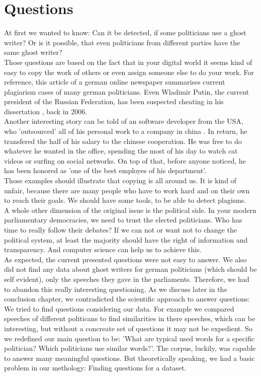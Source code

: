 \documentclass[12pt,paper=a4,nenglish]{scrreprt}
\begin{document}
\section{Questions}
At first we wanted to know: Can it be detected, if some politicians
use a ghost writer? Or is it possible, that even politicians from different
parties have the same ghost writer? \\ 
Those questions are based on the fact that in your digital world it
seems kind of easy to copy the work of others or even assign someone else to do
your work. For reference, this article \cite{plagiat_1} of a german online newspaper 
summarises current plagiarism cases of many german politicians. 
Even Wladimir Putin, the current president of the Russian Federation, has been
suspected cheating in his dissertation \cite{plagiat_2}, back in
2006. \\
Another interesting story can be told of an software developer from the USA,
who 'outsourced' all of his personal work to a company in china
\cite{plagiat_3}. In return, he transfered the half of his salary to the chinese
cooperation. He was free to do whatever he wanted in the office, spending the
most of his day to watch cat videos or surfing on social networks. 
On top of that, before anyone noticed, he has been honored as 'one of the best
employes of his department'. \\
Those examples should illustrate that copying is all around us. 
It is kind of unfair, because there are many people who have to work hard and on
their own to reach their goals. We should have some tools, to be able to detect plagisms.\\
A whole other dimension of the original issue is the political side. In your
modern parliamentary democracies, we need to trust the elected
politicians. Who has time to really follow their debates? If we can not or
want not to change the political system, at least the majority should have the
right of information and transparency. And computer science can help us to achieve this.
\\
As expected, the current presented questions were not easy to
answer. We also did not find any data about ghost writers for german
politicians (which should be self evident), only the speeches they gave in the
parliaments.
Therefore, we had to abandon this really interesting questioning. As
we discuss later in the conclusion chapter, we contradicted the scientific
approach to answer questions: We tried to find questions considering our data. 
For example we compared speeches of different politicans to find similarities
in there speeches, which can be interesting, but without a concreate set of
questions it may not be expedient.  
So we redefined our main question to be: 'What are typical used words for a
specific politician? Which politicians use similar words?'. 
The corpus, luckily, was capable to answer many meaningful questions. But
theoretically speaking, we had a basic problem in our methology: Finding questions for a
dataset. 
\end{document}
